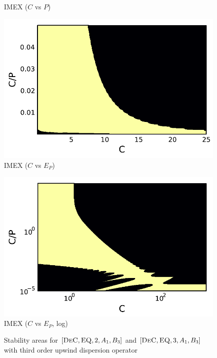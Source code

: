 \begin{example}
\begin{figure}
\begin{minipage}[t]{0.32\textwidth}
			IMEX  ($C$ vs $P$)
		\end{minipage} 
		\begin{minipage}[t]{0.32\textwidth}
			\centering
			\includegraphics[width=\textwidth]{pdf/pdepics/disp/contourf_adv_disp_IMEXDeC_equispaced_3_disp_Shu_adv_1_CE.pdf}
			IMEX  ($C$ vs $E_P$)
		\end{minipage}
		\begin{minipage}[t]{0.32\textwidth}
			\centering
			\includegraphics[width=\textwidth]{pdf/pdepics/disp/contourf_adv_disp_IMEXDeC_gaussLobatto_3_disp_Shu_adv_1_CE_higher.pdf}
			IMEX  ($C$ vs $E_P$, log)
		\end{minipage}
		\caption{Stability areas for $[\textsc{DeC}, \textsc{EQ},2,A_1, B_3]$ and $[\textsc{DeC}, \textsc{EQ},3,A_1, B_3]$  with third order upwind dispersion operator}
		\label{fig: disp_IIMEXDeC2/3_GLB_CvsE_upwind}
	\end{figure}
\end{example}




